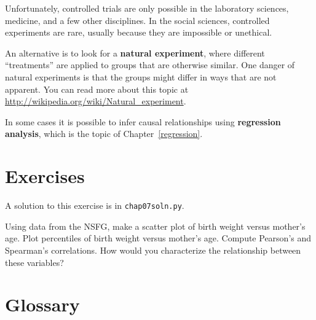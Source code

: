 Unfortunately, controlled trials are only possible in the laboratory
sciences, medicine, and a few other disciplines.  In the social sciences,
controlled experiments are rare, usually because they are impossible
or unethical.

An alternative is to look for a {\bf natural experiment}, where
different ``treatments'' are applied to groups that are otherwise
similar.  One danger of natural experiments is that the groups might
differ in ways that are not apparent.  You can read more about this
topic at \url{http://wikipedia.org/wiki/Natural_experiment}.

In some cases it is possible to infer causal relationships using {\bf
  regression analysis}, which is the topic of Chapter~\ref{regression}.


\section{Exercises}

A solution to this exercise is in \verb"chap07soln.py".

\begin{exercise}
Using data from the NSFG, make a scatter plot of birth weight
versus mother's age.  Plot percentiles of birth weight
versus mother's age.  Compute Pearson's and Spearman's correlations.
How would you characterize the relationship
between these variables?
\end{exercise}


\section{Glossary}

